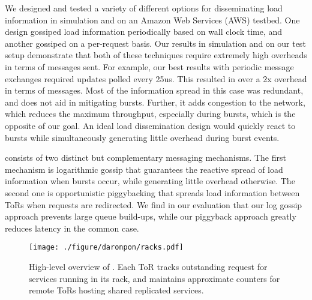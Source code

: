 We designed and tested a variety of different options for disseminating load
information in simulation and on an Amazon Web Services (AWS) testbed.  One
design gossiped load information periodically based on wall clock time, and
another gossiped on a per-request basis. Our results in simulation and on our
test setup demonstrate that both of these techniques require extremely high
overheads in terms of messages sent.  For example, our best results with
periodic message exchanges required updates polled every 25us. This resulted in
over a 2x overhead in terms of messages. Most of the information spread in this
case was redundant, and does not aid in mitigating bursts.  Further, it adds
congestion to the network, which reduces the maximum throughput, especially
during bursts, which is the opposite of our goal. An ideal load dissemination
design would quickly react to bursts while simultaneously generating little
overhead during burst events.

\daronpon consists of two distinct but complementary messaging
mechanisms.  
%
The first mechanism is logarithmic gossip that guarantees the reactive spread of load information when bursts occur, 
while generating little overhead otherwise.  
%
The second one is opportunistic piggybacking that spreads load information between ToRs when requests are
redirected. 
%
We find in our evaluation that our log gossip approach prevents large queue build-ups, while our piggyback approach greatly reduces latency in the common case.  
%

\begin{figure}[ht]
  \centering
    \texttt{[image: ./figure/daronpon/racks.pdf]}
    \caption{High-level overview of \daronpon. Each ToR tracks
    outstanding request for services running in its rack, and
    maintains approximate counters for remote ToRs hosting shared
    replicated services.} 

  \label{fig:racks}
\end{figure}


